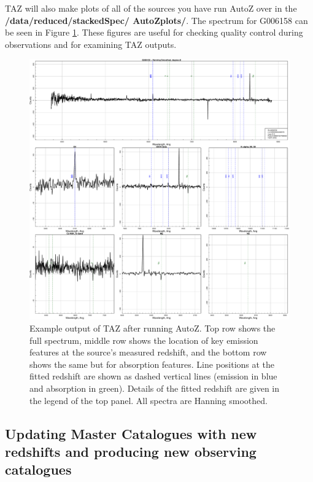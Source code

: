 \documentclass[12pt]{article}
\begin{document}
TAZ will also make plots of all of the sources you have run AutoZ over in the \textbf{/data/reduced/stackedSpec/ AutoZplots/}. The spectrum for G006158 can be seen in Figure \ref{fig:specEx}. These figures are useful for checking quality control during observations and for examining TAZ outputs.

\begin{figure}
\begin{center}
\includegraphics[scale=0.4]{G006158.pdf}
\caption{Example output of TAZ after running AutoZ. Top row shows the full spectrum, middle row shows the location of key emission features at the source's measured redshift, and the bottom row shows the same but for absorption features. Line positions at the fitted redshift are shown as dashed vertical lines (emission in blue and absorption in green). Details of the fitted redshift are given in the legend of the top panel. All spectra are Hanning smoothed.}
\label{fig:specEx}
\end{center}
\end{figure}


 \subsection{Updating Master Catalogues with new redshifts and producing new observing catalogues}
\end{document}
